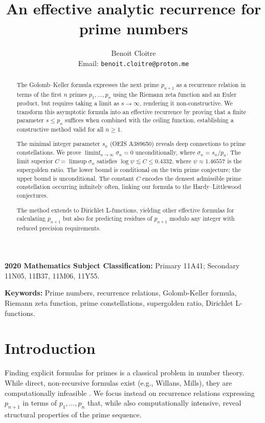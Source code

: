 \documentclass[12pt]{article}
\title{An effective analytic recurrence for prime numbers}
\author{Benoit Cloitre\\
Email: \texttt{benoit.cloitre@proton.me}}
\date{}
\theoremstyle{plain}
\theoremstyle{definition}
\theoremstyle{remark}
\begin{document}
\maketitle

\begin{abstract}
The Golomb--Keller formula expresses the next prime $p_{n+1}$ as a recurrence relation in terms of the first $n$ primes $p_1, \ldots, p_n$ using the Riemann zeta function and an Euler product, but requires taking a limit as $s \to \infty$, rendering it non-constructive. We transform this asymptotic formula into an effective recurrence by proving that a finite parameter $s \leq p_n$ suffices when combined with the ceiling function, establishing a constructive method valid for all $n \geq 1$.

The minimal integer parameter $s_n$ (OEIS A389650) reveals deep connections to prime constellations. We prove $\liminf_{n\to\infty} \sigma_n = 0$ unconditionally, where $\sigma_n = s_n/p_n$. The limit superior $C = \limsup \sigma_n$ satisfies $\log \psi \lesssim C \leq 0.4332$, where $\psi \approx 1.46557$ is the supergolden ratio. The lower bound is conditional on the twin prime conjecture; the upper bound is unconditional. The constant $C$ encodes the densest admissible prime constellation occurring infinitely often, linking our formula to the Hardy--Littlewood conjectures.

The method extends to Dirichlet L-functions, yielding other effective formulas for calculating $p_{n+1}$ but also for predicting residues of $p_{n+1}$ modulo any integer with reduced precision requirements.
\end{abstract}

\noindent
\textbf{2020 Mathematics Subject Classification:} Primary 11A41; Secondary 11N05, 11B37, 11M06, 11Y55.

\noindent
\textbf{Keywords:} Prime numbers, recurrence relations, Golomb-Keller formula, Riemann zeta function, prime constellations, supergolden ratio, Dirichlet L-functions.

\section{Introduction}

Finding explicit formulas for primes is a classical problem in number theory. While direct, non-recursive formulas exist (e.g., Willans, Mills), they are computationally infeasible \cite{Ribenboim}. We focus instead on recurrence relations expressing $p_{n+1}$ in terms of $p_1, \ldots, p_n$ that, while also computationally intensive, reveal structural properties of the prime sequence.
\end{document}
